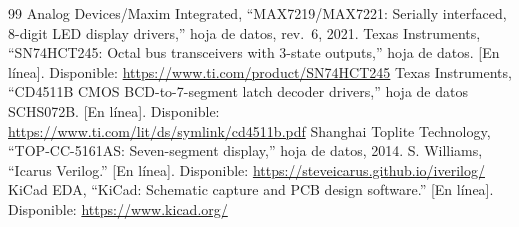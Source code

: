 \documentclass[conference,a4paper]{IEEEtran}
\begin{document}
\begin{thebibliography}{99}
 Analog Devices/Maxim Integrated, ``MAX7219/MAX7221: Serially interfaced, 8-digit LED display drivers,'' hoja de datos, rev.~6, 2021.
 Texas Instruments, ``SN74HCT245: Octal bus transceivers with 3-state outputs,'' hoja de datos. [En línea]. Disponible: \url{https://www.ti.com/product/SN74HCT245}
 Texas Instruments, ``CD4511B CMOS BCD-to-7-segment latch decoder drivers,'' hoja de datos SCHS072B. [En línea]. Disponible: \url{https://www.ti.com/lit/ds/symlink/cd4511b.pdf}
 Shanghai Toplite Technology, ``TOP-CC-5161AS: Seven-segment display,'' hoja de datos, 2014.
 S. Williams, ``Icarus Verilog.'' [En línea]. Disponible: \url{https://steveicarus.github.io/iverilog/}
 KiCad EDA, ``KiCad: Schematic capture and PCB design software.'' [En línea]. Disponible: \url{https://www.kicad.org/}
\end{thebibliography}
\end{document}
